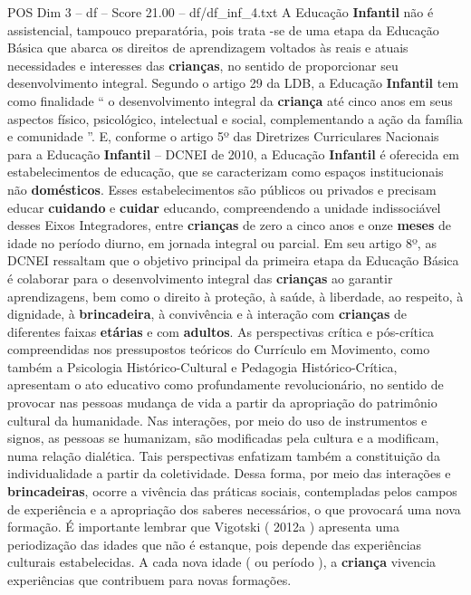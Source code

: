 \begin{textsample}{POS Dim 3 – df – Score 21.00 – df/df\_inf\_4.txt}
A Educação \textbf{Infantil} não é assistencial, tampouco preparatória, pois trata -se de uma etapa da Educação Básica que abarca os direitos de aprendizagem voltados às reais e atuais necessidades e interesses das \textbf{crianças}, no sentido de proporcionar seu desenvolvimento integral.
Segundo o artigo 29 da LDB, a Educação \textbf{Infantil} tem como finalidade “ o desenvolvimento integral da \textbf{criança} até cinco anos em seus aspectos físico, psicológico, intelectual e social, complementando a ação da família e comunidade ”.
E, conforme o artigo 5º das Diretrizes Curriculares Nacionais para a Educação \textbf{Infantil} – DCNEI de 2010, a Educação \textbf{Infantil} é oferecida em estabelecimentos de educação, que se caracterizam como espaços institucionais não \textbf{domésticos}.
Esses estabelecimentos são públicos ou privados e precisam educar \textbf{cuidando} e \textbf{cuidar} educando, compreendendo a unidade indissociável desses Eixos Integradores, entre \textbf{crianças} de zero a cinco anos e onze \textbf{meses} de idade no período diurno, em jornada integral ou parcial.
Em seu artigo 8º, as DCNEI ressaltam que o objetivo principal da primeira etapa da Educação Básica é colaborar para o desenvolvimento integral das \textbf{crianças} ao garantir aprendizagens, bem como o direito à proteção, à saúde, à liberdade, ao respeito, à dignidade, à \textbf{brincadeira}, à convivência e à interação com \textbf{crianças} de diferentes faixas \textbf{etárias} e com \textbf{adultos}.
As perspectivas crítica e pós-crítica compreendidas nos pressupostos teóricos do Currículo em Movimento, como também a Psicologia Histórico-Cultural e Pedagogia Histórico-Crítica, apresentam o ato educativo como profundamente revolucionário, no sentido de provocar nas pessoas mudança de vida a partir da apropriação do patrimônio cultural da humanidade.
Nas interações, por meio do uso de instrumentos e signos, as pessoas se humanizam, são modificadas pela cultura e a modificam, numa relação dialética.
Tais perspectivas enfatizam também a constituição da individualidade a partir da coletividade.
Dessa forma, por meio das interações e \textbf{brincadeiras}, ocorre a vivência das práticas sociais, contempladas pelos campos de experiência e a apropriação dos saberes necessários, o que provocará uma nova formação.
É importante lembrar que Vigotski ( 2012a ) apresenta uma periodização das idades que não é estanque, pois depende das experiências culturais estabelecidas.
A cada nova idade ( ou período ), a \textbf{criança} vivencia experiências que contribuem para novas formações.

\end{textsample}
